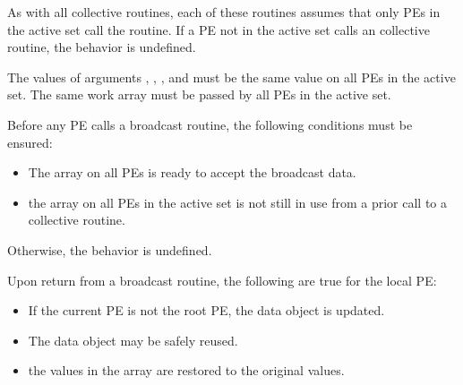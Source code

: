 \begin{apidefinition}
{    As with all  \oldtext{\openshmem} collective routines,
    each of these routines assumes that
    only \acp{PE} in the active set call the routine.  If a \ac{PE} not in the
    active set calls an  \oldtext{\openshmem}
    collective routine, the behavior is undefined.
    
    The values of arguments , , ,
    and  must be the same value on all \acp{PE} in the active set.
    The same  work array must be passed by all \acp{PE} in the active set.

    Before any \ac{PE} calls a broadcast routine, the following conditions must be ensured:

    \begin{itemize}
    \item The \dest{} array on all \acp{PE} 
      is ready to accept the broadcast data.
    \item {} the
       array on all \acp{PE} in the
      active set is not still in use from a prior call to a collective
      \openshmem routine.
    \end{itemize}
    Otherwise, the behavior is undefined.

    Upon return from a broadcast routine, the following are true for the local
    \ac{PE}:
    \begin{itemize}
    \item If the current \ac{PE} is not the root \ac{PE},
      the \dest{} data object is updated.
    \item The \source{} data object may be safely reused.
    \item {}
    the values in the  array are restored to the original values.
    \end{itemize}
}




\end{apidefinition}
